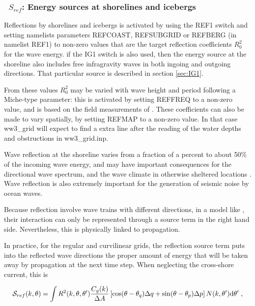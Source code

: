 \vsssub
\subsubsection{~$S_{ref}$: Energy sources at shorelines and icebergs} \label{sec:REF1}
\vsssub


\noindent 
Reflections by shorelines and icebergs is activated by using the {\code REF1}
switch and setting namelists parameters {\code REFCOAST}, {\code REFSUBGRID}
or {\code REFBERG} (in namelist {\code REF1}) to non-zero values that are the
target reflection coefficients $R_0^2$ for the wave energy.  if the {\code
IG1} switch is also used, then the energy source at the shoreline also
includes free infragravity waves in both ingoing and outgoing directions.
That particular source is described in section
\ref{sec:IG1}.

From these values $R_0^2$ may be varied with wave height and period following
a Miche-type parameter: this is activated by setting {\code REFFREQ} to a
non-zero value, and is based on the field measurements of \cite{art:EHG94}.
These coefficients can also be made to vary spatially, by setting {\code
REFMAP} to a non-zero value. In that case ww3\_grid will expect to find a
extra line after the reading of the water depths and obstructions in
ww3\_grid.inp.

Wave reflection at the shoreline varies from a fraction of a percent to about
50\% of the incoming wave energy, and may have important consequences for the
directional wave spectrum, and the wave climate in otherwise sheltered
locations \citep{pro:ORe99}. Wave reflection is also extremely important for
the generation of seismic noise by ocean waves.

Because reflection involve wave trains with different directions, in a model
like \ws, their interaction can only be represented through a source term in
the right hand side. Nevertheless, this is physically linked to propagation.

In practice, for the regular and curvilinear grids, the reflection source term
puts into the reflected wave directions the proper amount of energy that will
be taken away by propagation at the next time step. When neglecting the
cross-shore current, this is

\begin{equation} 
{\cal S}_{ref}(k,\theta) = 
\int R^2(k,\theta,\theta') \frac{C_g(k)}{\Delta A} \left[\cos (\theta-\theta_q) \Delta q + \sin (\theta-\theta_p)  \Delta p \right] N(k,\theta') \mathrm{d} \theta' \; ,
\end{equation}

